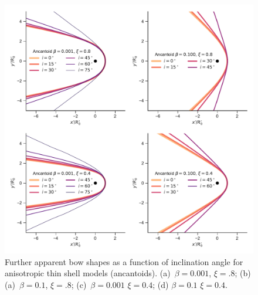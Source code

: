\begin{figure}
  \centering
  \includegraphics[width=0.8\linewidth]{figs/test_xyprime_ancantoid}
  \caption{Further apparent bow shapes as a function of inclination
    angle for anisotropic thin shell models (ancantoids).
    (a)~\(\beta = 0.001\), \(\xi =.8\); (b) (a)~\(\beta = 0.1\),
    \(\xi =.8\); (c)~\(\beta = 0.001\) \(\xi =0.4\); (d)
    \(\beta = 0.1\) \(\xi =0.4\).}
  \label{fig:xyprime-anacantoid}
\end{figure}


